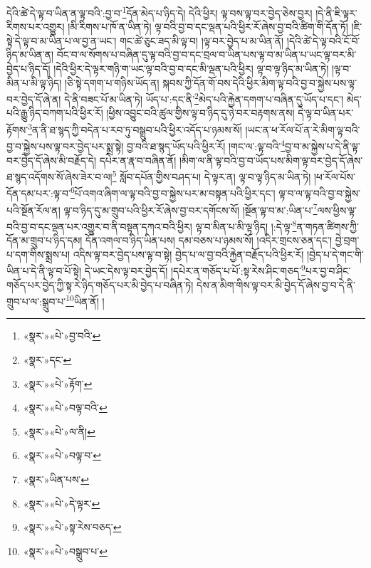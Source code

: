 དེའི་ཚེ་དེ་ལྟ་བ་ཡིན་ན་ལྟ་བའི་:བྱ་བ་\footnote{«སྣར་»«པེ་»བྱ་བའི་}དོན་མེད་པ་ཉིད་དེ། དེའི་ཕྱིར། ལྟ་བས་ལྟ་བར་བྱེད་ཅེས་བྱར། །དེ་ནི་ཇི་ལྟར་རིགས་པར་འགྱུར། །མི་རིགས་པ་ཁོ་ན་ཡིན་ཏེ། ལྟ་བའི་བྱ་བ་དང་ལྡན་པའི་ཕྱིར་རོ་ཞེས་བྱ་བའི་ཚིག་གི་དོན་ཏོ། །ཇི་སྟེ་དེ་ལྟ་བ་མ་ཡིན་པ་ལ་བྱ་ན་ཡང་། གང་ཚེ་ཅུང་ཟད་མི་ལྟ་བ། །ལྟ་བར་བྱེད་པ་མ་ཡིན་ནོ། །དེའི་ཚེ་དེ་ལྟ་བའི་ངོ་བོ་ཉིད་མ་ཡིན་ན། བོང་བ་ལ་སོགས་པ་བཞིན་དུ་ལྟ་བའི་བྱ་བ་དང་བྲལ་བ་ཡིན་པས་ལྟ་བ་མ་ཡིན་པ་ཡང་ལྟ་བར་མི་བྱེད་པ་ཉིད་དོ། །དེའི་ཕྱིར་དེ་ལྟར་གཉི་ག་ཡང་ལྟ་བའི་བྱ་བ་དང་མི་ལྡན་པའི་ཕྱིར། ལྟ་བ་ལྟ་ཉིད་མ་ཡིན་ཏེ། །ལྟ་བ་མིན་པ་མི་ལྟ་ཉིད། །ཅི་སྟེ་དགག་པ་གཉིས་ཡོད་ན། སྐབས་ཀྱི་དོན་གོ་བས་དེའི་ཕྱིར་མིག་ལྟ་བའི་བྱ་བ་སྐྱེས་པས་ལྟ་བར་བྱེད་དོ་ཞེ་ན། དེ་ནི་བཟང་པོ་མ་ཡིན་ཏེ། ཡོད་པ་:དང་ནི་\footnote{«སྣར་»དང་}མེད་པའི་རྐྱེན་དགག་པ་བཞིན་དུ་ཡོད་པ་དང་། མེད་པའི་རྒྱུ་ཉིད་བཀག་པའི་ཕྱིར་རོ། །ཕྱིས་འབྱུང་བའི་ཚུལ་གྱིས་ལྟ་བ་ཉིད་དུ་ཉེ་བར་བརྟགས་ནས། དེ་ལྟ་བ་ཡིན་པར་རྟོགས་\footnote{«སྣར་»«པེ་»རྟོག་}ན་ནི་ཐ་སྙད་ཀྱི་བདེན་པ་རབ་ཏུ་བསྒྲུབ་པའི་ཕྱིར་འདོད་པ་ཉམས་སོ། །ཡང་ན་ཕ་རོལ་པོ་ན་རེ་མིག་ལྟ་བའི་བྱ་བ་སྐྱེས་པས་ལྟ་བར་བྱེད་པར་སྨྲ་སྟེ། བྱ་བའི་ཐ་སྙད་ཡོད་པའི་ཕྱིར་རོ། །གང་ལ་:ལྟ་བའི་\footnote{«སྣར་»«པེ་»བལྟ་བའི་}བྱ་བ་མ་སྐྱེས་པ་དེ་ནི་ལྟ་བར་བྱེད་དོ་ཞེས་མི་བརྗོད་དེ། དཔེར་ན་རྣ་བ་བཞིན་ནོ། །མིག་ལ་ནི་ལྟ་བའི་བྱ་བ་ཡོད་པས་མིག་ལྟ་བར་བྱེད་དོ་ཞེས་ཐ་སྙད་འདོགས་སོ་ཞེས་ཟེར་བ་ལ།\footnote{«སྣར་»«པེ་»ལ་ནི།} སློབ་དཔོན་གྱིས་བཤད་པ། དེ་ལྟར་ན། ལྟ་བ་ལྟ་ཉིད་མ་ཡིན་ཏེ། །ཕ་རོལ་པོས་དོན་དམ་པར་:ལྟ་བ་\footnote{«སྣར་»«པེ་»བལྟ་བ་}པོ་འགའ་ཞིག་ལ་ལྟ་བའི་བྱ་བ་སྐྱེས་པར་མ་བསྟན་པའི་ཕྱིར་དང་། ལྟ་བ་ལ་ལྟ་བའི་བྱ་བ་སྐྱེས་པའི་སྔོན་རོལ་ན། ལྟ་བ་ཉིད་དུ་མ་གྲུབ་པའི་ཕྱིར་རོ་ཞེས་བྱ་བར་དགོངས་སོ། །སྔོན་ལྟ་བ་མ་:ཡིན་པ་\footnote{«སྣར་»ཡིན་པས་}ལས་ཕྱིས་ལྟ་བའི་བྱ་བ་དང་ལྡན་པར་འགྱུར་བ་ནི་བསྟན་དཀའ་བའི་ཕྱིར། ལྟ་བ་མིན་པ་མི་ལྟ་ཉིད། །:དེ་ལྟ་\footnote{«སྣར་»«པེ་»དེ་ལྟར་}ན་གཏན་ཚིགས་ཀྱི་དོན་མ་གྲུབ་པ་ཉིད་དམ། དོན་འགལ་བ་ཉིད་ཡིན་པས། དམ་བཅས་པ་ཉམས་སོ། །འདིར་གྲངས་ཅན་དང་། བྱེ་བྲག་པ་དག་གིས་སྨྲས་པ། འདིས་ལྟ་བར་བྱེད་པས་ལྟ་བ་སྟེ། བྱེད་པ་ལ་བྱ་བའི་རྐྱེན་བརྗོད་པའི་ཕྱིར་རོ། །བྱེད་པ་དེ་གང་གི་ཡིན་པ་དེ་ནི་ལྟ་བ་པོ་སྟེ། དེ་ཡང་དེས་ལྟ་བར་བྱེད་དོ། །དཔེར་ན་གཅོད་པ་པོ་:སྟ་རེས་ཤིང་གཅད་\footnote{«སྣར་»«པེ་»སྟ་རེས་བཅད་}པར་བྱ་བ་ཤིང་གཅོད་པར་བྱེད་ཀྱི་སྟ་རེ་ཉིད་གཅོད་པར་མི་བྱེད་པ་བཞིན་ཏེ། དེས་ན་མིག་གིས་ལྟ་བར་མི་བྱེད་དོ་ཞེས་བྱ་བ་དེ་ནི་གྲུབ་པ་ལ་:སྒྲུབ་པ་\footnote{«སྣར་»«པེ་»བསྒྲུབ་པ་}ཡིན་ནོ། །
